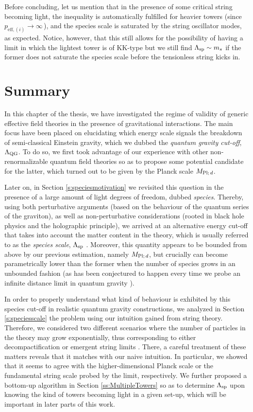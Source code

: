 Before concluding, let us mention that in the presence of some critical string becoming light, the inequality is automatically fulfilled for heavier towers (since $p_{\text{eff,}\, (i)} \to \infty\, $), and the species scale is saturated by the string oscillator modes, as expected. Notice, however, that this still allows for the possibility of having a limit in which the lightest tower is of KK-type but we still find $\Lambda_{\text{sp}} \sim m_s$ if the former does not saturate the species scale before the tensionless string kicks in. 

\section{Summary}

In this chapter of the thesis, we have investigated the regime of validity of generic effective field theories in the presence of gravitational interactions. The main focus have been placed on elucidating which energy scale signals the breakdown of semi-classical Einstein gravity, which we dubbed the \emph{quantum gravity cut-off}, $\Lambda_{\text{QG}}$. To do so, we first took advantage of our experience with other non-renormalizable quantum field theories so as to propose some potential candidate for the latter, which turned out to be given by the Planck scale $M_{\text{Pl;}\, d}$. 

Later on, in Section \ref{s:speciesmotivation} we revisited this question in the presence of a large amount of light degrees of freedom, dubbed \emph{species}. Thereby, using both perturbative arguments (based on the behaviour of the quantum series of the graviton), as well as non-perturbative considerations (rooted in black hole physics and the holographic principle), we arrived at an alternative energy cut-off that takes into account the matter content in the theory, which is usually referred to as the \emph{species scale}, $\Lambda_{\text{sp}}$ \cite{Dvali:2007hz, Dvali:2007wp}. Moreover, this quantity appears to be bounded from above by our previous estimation, namely $M_{\text{Pl;}\, d}$, but crucially can become parametrically lower than the former when the number of species grows in an unbounded fashion (as has been conjectured to happen every time we probe an infinite distance limit in quantum gravity \cite{Ooguri:2006in}).

In order to properly understand what kind of behaviour is exhibited by this species cut-off in realistic quantum gravity constructions, we analyzed in Section \ref{s:speciesscale} the problem using our intuition gained from string theory. Therefore, we considered two different scenarios where the number of particles in the theory may grow exponentially, thus corresponding to either decompactification or emergent string limits \cite{Lee:2019wij}. There, a careful treatment of these matters reveals that it matches with our naive intuition. In particular, we showed that it seems to agree with the higher-dimensional Planck scale or the fundamental string scale probed by the limit, respectively. We further proposed a bottom-up algorithm in Section \ref{ss:MultipleTowers} so as to determine $\Lambda_{\text{sp}}$ upon knowing the kind of towers becoming light in a given set-up, which will be important in later parts of this work.

